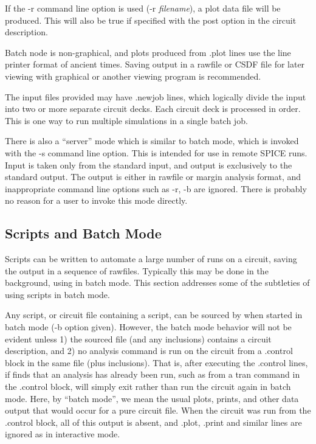 If the {\vt -r} command line option is used ({\vt -r} {\it
filename\/}), a plot data file will be produced.  This will also be
true if specified with the {\vt post} option in the circuit
description.

Batch node is non-graphical, and plots produced from {\vt .plot} lines
use the line printer format of ancient times.  Saving output in a
rawfile or CSDF file for later viewing with graphical {\WRspice} or
another viewing program is recommended.

The input files provided may have {\vt .newjob} lines, which logically
divide the input into two or more separate circuit decks.  Each
circuit deck is processed in order.  This is one way to run multiple
simulations in a single batch job.

There is also a ``server'' mode which is similar to batch mode, which
is invoked with the {\vt -s} command line option.  This is intended
for use in remote SPICE runs.  Input is taken only from the standard
input, and output is exclusively to the standard output.  The output
is either in rawfile or margin analysis format, and inappropriate
command line options such as {\vt -r}, {\vt -b} are ignored.  There is
probably no reason for a user to invoke this mode directly.

\subsection{Scripts and Batch Mode}

Scripts can be written to automate a large number of runs on a
circuit, saving the output in a sequence of rawfiles.  Typically this
may be done in the background, using {\WRspice} in batch mode.  This
section addresses some of the subtleties of using scripts in batch
mode.

Any script, or circuit file containing a script, can be sourced by
{\WRspice} when started in batch mode ({\vt -b} option given). 
However, the batch mode behavior will not be evident unless 1) the
sourced file (and any inclusions) contains a circuit description, and
2) no analysis command is run on the circuit from a {\vt .control}
block in the same file (plus inclusions).  That is, after executing
the {\vt .control} lines, if {\WRspice} finds that an analysis has
already been run, such as from a {\cb tran} command in the {\vt
.control} block, {\WRspice} will simply exit rather than run the
circuit again in batch mode.  Here, by ``batch mode'', we mean the
usual plots, prints, and other data output that would occur for a pure
circuit file.  When the circuit was run from the {\vt .control} block,
all of this output is absent, and {\vt .plot}, {\vt .print} and
similar lines are ignored as in interactive mode.

